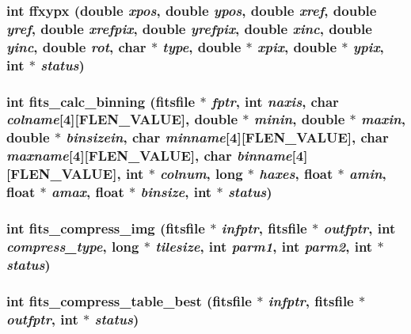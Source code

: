 \subsubsection{\setlength{\rightskip}{0pt plus 5cm}int ffxypx (double {\em xpos}, double {\em ypos}, double {\em xref}, double {\em yref}, double {\em xrefpix}, double {\em yrefpix}, double {\em xinc}, double {\em yinc}, double {\em rot}, char $\ast$ {\em type}, double $\ast$ {\em xpix}, double $\ast$ {\em ypix}, int $\ast$ {\em status})}\label{fitsio__64_8h_890c3c28eeb1c56fbbb271a8b6bab6aa}


\subsubsection{\setlength{\rightskip}{0pt plus 5cm}int fits\_\-calc\_\-binning (\bf{fitsfile} $\ast$ {\em fptr}, int {\em naxis}, char {\em colname}[4][FLEN\_\-VALUE], double $\ast$ {\em minin}, double $\ast$ {\em maxin}, double $\ast$ {\em binsizein}, char {\em minname}[4][FLEN\_\-VALUE], char {\em maxname}[4][FLEN\_\-VALUE], char {\em binname}[4][FLEN\_\-VALUE], int $\ast$ {\em colnum}, long $\ast$ {\em haxes}, float $\ast$ {\em amin}, float $\ast$ {\em amax}, float $\ast$ {\em binsize}, int $\ast$ {\em status})}\label{fitsio__64_8h_0e2cdd3a6e198dc69fac9573d398ac99}


\subsubsection{\setlength{\rightskip}{0pt plus 5cm}int fits\_\-compress\_\-img (\bf{fitsfile} $\ast$ {\em infptr}, \bf{fitsfile} $\ast$ {\em outfptr}, int {\em compress\_\-type}, long $\ast$ {\em tilesize}, int {\em parm1}, int {\em parm2}, int $\ast$ {\em status})}\label{fitsio__64_8h_54de37ff809d979bb6c319989c0b41b7}


\subsubsection{\setlength{\rightskip}{0pt plus 5cm}int fits\_\-compress\_\-table\_\-best (\bf{fitsfile} $\ast$ {\em infptr}, \bf{fitsfile} $\ast$ {\em outfptr}, int $\ast$ {\em status})}\label{fitsio__64_8h_cc1337757f4d544d15c6da040e6e537d}


